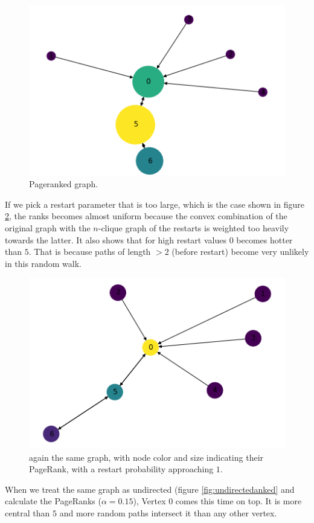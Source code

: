 \begin{figure}[!htb]
\begin{framed}
  \centering
    \includegraphics[width=0.55\linewidth]{figures/directed_graph_example.png}
  \caption{Pageranked graph.}
  \label{fig:weaklyconnectedpagedranked}
\end{framed}
\end{figure}

If we pick a restart parameter that is too large, which is the case
shown in figure \ref{fig:weaklyconnectedpagedrankedbadly}, the ranks
becomes almost uniform because the convex combination of the
original graph with the $n$-clique graph of the restarts is weighted
too heavily towards the latter. It also shows that for high restart
values $0$ becomes hotter than $5$. That is because paths of length
$\gt 2$ (before restart) become very unlikely in this random walk.

\begin{figure}[!htb]
\begin{framed}
  \centering
    \includegraphics[width=0.55\linewidth]{figures/directed_graph_example_tinyalpha.png}
  \caption{again the same graph, with node color and size indicating
  their PageRank, with a restart probability approaching $1$.}
  \label{fig:weaklyconnectedpagedrankedbadly}
\end{framed}
\end{figure}

When we treat the same graph as undirected (figure
\ref{fig:undirectedanked} and calculate the PageRanks
($\alpha=0.15$), Vertex $0$ comes this time on top. It is more
central than $5$ and more random paths intersect it than any other
vertex.


